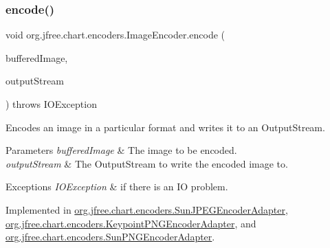 \mbox{\label{interfaceorg_1_1jfree_1_1chart_1_1encoders_1_1_image_encoder_ad9396ba6a8a9c6f490a31f36f2226dac}} 
\subsubsection{\texorpdfstring{encode()}{encode()}\hspace{0.1cm}{\footnotesize\ttfamily [2/2]}}
{\footnotesize\ttfamily void org.\+jfree.\+chart.\+encoders.\+Image\+Encoder.\+encode (\begin{DoxyParamCaption}\item[{Buffered\+Image}]{buffered\+Image,  }\item[{Output\+Stream}]{output\+Stream }\end{DoxyParamCaption}) throws I\+O\+Exception}

Encodes an image in a particular format and writes it to an Output\+Stream.


\begin{DoxyParams}{Parameters}
{\em buffered\+Image} & The image to be encoded. \\
\hline
{\em output\+Stream} & The Output\+Stream to write the encoded image to. \\
\hline
\end{DoxyParams}

\begin{DoxyExceptions}{Exceptions}
{\em I\+O\+Exception} & if there is an IO problem. \\
\hline
\end{DoxyExceptions}


Implemented in \mbox{\hyperlink{classorg_1_1jfree_1_1chart_1_1encoders_1_1_sun_j_p_e_g_encoder_adapter_a04af4aa9592b9b63934742a6fce74fcd}{org.\+jfree.\+chart.\+encoders.\+Sun\+J\+P\+E\+G\+Encoder\+Adapter}}, \mbox{\hyperlink{classorg_1_1jfree_1_1chart_1_1encoders_1_1_keypoint_p_n_g_encoder_adapter_ae839184a415b924b8ee0a47c5df1234d}{org.\+jfree.\+chart.\+encoders.\+Keypoint\+P\+N\+G\+Encoder\+Adapter}}, and \mbox{\hyperlink{classorg_1_1jfree_1_1chart_1_1encoders_1_1_sun_p_n_g_encoder_adapter_ad1bb8a4e33cc9a8b6b259c0955d807f1}{org.\+jfree.\+chart.\+encoders.\+Sun\+P\+N\+G\+Encoder\+Adapter}}.

